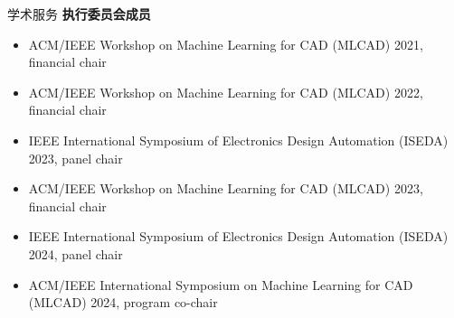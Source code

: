 \begin{rSection}{学术服务}
\textbf{执行委员会成员}
\begin{itemize}
    \item ACM/IEEE Workshop on Machine Learning for CAD (MLCAD) 2021, financial chair
    \item ACM/IEEE Workshop on Machine Learning for CAD (MLCAD) 2022, financial chair
    \item IEEE International Symposium of Electronics Design Automation (ISEDA) 2023, panel chair
    \item ACM/IEEE Workshop on Machine Learning for CAD (MLCAD) 2023, financial chair
    \item IEEE International Symposium of Electronics Design Automation (ISEDA) 2024, panel chair
    \item ACM/IEEE International Symposium on Machine Learning for CAD (MLCAD) 2024, program co-chair
\end{itemize}

\end{rSection}


